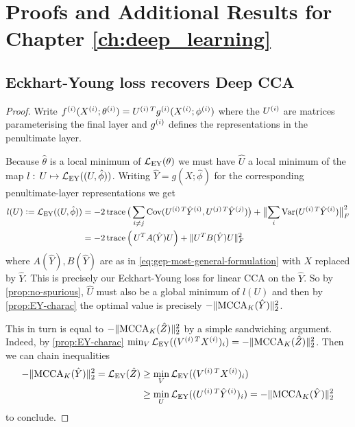 \chapter{Proofs and Additional Results for Chapter \ref{ch:deep_learning}}\label{app:deep_learning}
\section{Eckhart-Young loss recovers Deep CCA}\label{supp:EY-recover-Deep-CCA}
\recoverDeepCCA* %
\begin{proof}
    Write $f\sps{i}(X\sps{i}; \theta\sps{i}) = U\spsT{i} g\sps{i}(X\sps{i}; \phi\sps{i})$ where the $U\sps{i}$ are matrices parameterising the final layer and $g\sps{i}$ defines the representations in the penultimate layer.

    Because $\hat{\theta}$ is a local minimum of $\LEY(\theta)$ we must have $\hat{U}$ a local minimum of the map $l: \, U \mapsto \LEY((U, \hat{\phi}))$. Writing $\hat{Y} = g(X; \hat{\phi})$ for the corresponding penultimate-layer representations we get
    \begin{align*}
        l(U) \defeq \LEY((U, \hat{\phi}))
        &= - 2 \tr \big(\sum_{i \neq j} \Cov(U\spsT{i} \hat{Y}\sps{i}, U\spsT{j} \hat{Y}\sps{j}) \big) + \norm[\big]{\sum_i \Var(U\spsT{i} \hat{Y}\sps{i})}_F^2 \\
        &= - 2 \tr \left( \,U^T A(\hat{Y}) U\right)  + \norm{U^T B(\hat{Y}) U}^2_F
    \end{align*}
    where $A(\hat{Y}), B(\hat{Y})$ are as in \cref{eq:gep-most-general-formulation} with $X$ replaced by $\hat{Y}$.
    This is precisely our Eckhart-Young loss for linear CCA on the $\hat{Y}$.
    So by \cref{prop:no-spurious}, $\hat{U}$ must also be a global minimum of $l(U)$ and then by \cref{prop:EY-charac} the optimal value is precisely $- \norm{\MCCA_K(\hat{Y})}_2^2$.

    This in turn is equal to $- \norm{\MCCA_K(\hat{Z})}_2^2$ by a simple sandwiching argument.
    Indeed, by \cref{prop:EY-charac} $\min_V \LEY((V\spsT{i} X\sps{i})_i) = - \norm{\MCCA_K(\hat{Z})}_2^2$.
    Then we can chain inequalities
    \begin{align*}
        - \norm{\MCCA_K(\hat{Y})}_2^2 = \LEY(\hat{Z})
        &\geq \min_V \LEY((V\spsT{i} X\sps{i})_i) \\
        &\geq \min_U \LEY((U\spsT{i} \hat{Y}\sps{i})_i) = - \norm{\MCCA_K(\hat{Y})}_2^2
    \end{align*}
    to conclude.
\end{proof}

